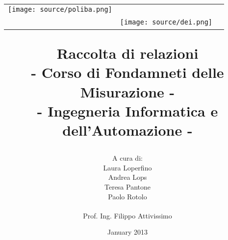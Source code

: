 \documentclass[a4paper, right=1cm]{book}
\begin{document}
	\layout
\title{\begin{center}
		\setlength{\tabcolsep}{0pt}
		\begin{tabular}{>{\raggedleft}m{2.5cm}>{\centering}m{\textwidth - 5cm\relax}>{\raggedright}m{2.5cm}}
			\texttt{[image: source/poliba.png]}%
			&%
			\textbf{ } \\[5pt]%
			\textbf{\ }%
			&%
			\texttt{[image: source/dei.png]} %
		\end{tabular}
	\end{center}
	\textbf{Raccolta di relazioni\\}
	\textbf{\large- Corso di Fondamneti delle Misurazione -\\ }
	{\normalsize 
		- Ingegneria Informatica e dell'Automazione -
}}
\author{A cura di:\\
	Laura Loperfino\\
	Andrea Lops \\
	Teresa Pantone\\
	Paolo Rotolo\\
	\\
	Prof. Ing. Filippo Attivissimo
}
\date{January 2013}


\frontmatter
\maketitle
\tableofcontents

\mainmatter


\backmatter
\end{document}
